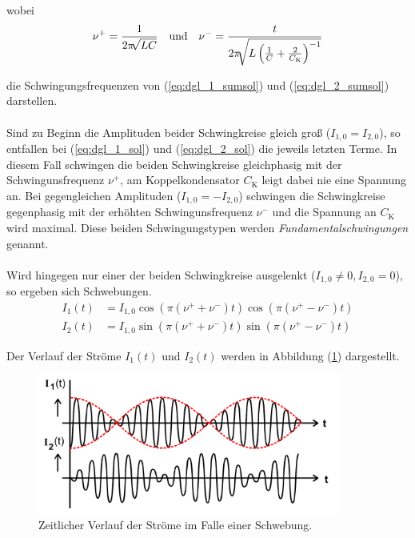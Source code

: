 wobei 
\begin{align} \label{eq:resonanzfrequenzen}
    \nu^+ &= \frac {1} {2 \pi \sqrt[]{LC}} & \mbox{\centering und} && \nu^- = \frac {t} {2 \pi \sqrt [] {L \left( \frac{1}{C} + \frac{2}{C_\text{K}} \right)^{-1} }}
\end{align}

die Schwingungsfrequenzen von (\ref{eq:dgl_1_sumsol}) und (\ref{eq:dgl_2_sumsol}) darstellen. \\
\\
Sind zu Beginn die Amplituden beider Schwingkreise gleich groß ($I_{1,0} = I_{2,0}$), so entfallen bei (\ref{eq:dgl_1_sol}) und (\ref{eq:dgl_2_sol})
die jeweils letzten Terme. In diesem Fall schwingen die beiden Schwingkreise gleichphasig mit der Schwingunsfrequenz $\nu^+$, am
Koppelkondensator $C_\text{K}$ leigt dabei nie eine Spannung an. Bei gegengleichen Amplituden ($I_{1,0} = -I_{2,0}$) schwingen die Schwingkreise gegenphasig
mit der erhöhten Schwingunsfrequenz $\nu^-$ und die Spannung an $C_\text{K}$ wird maximal. Diese beiden Schwingungstypen werden \textit{Fundamentalschwingungen} genannt. \\
\\
Wird hingegen nur einer der beiden Schwingkreise ausgelenkt ($I_{1,0} \neq 0, I_{2,0} = 0$), so ergeben sich Schwebungen.
\begin{align}
    I_{1}(t) &= I_{1,0} \cos(\pi (\nu^+ + \nu^-) t) \cos(\pi (\nu^+ - \nu^-) t) \label{eq:dgl_1_sol_schweb} \\
    I_{2}(t) &= I_{1,0} \sin(\pi (\nu^+ + \nu^-) t) \sin(\pi (\nu^+ - \nu^-) t) \label{eq:dgl_2_sol_schweb} 
\end{align}

Der Verlauf der Ströme $I_{1}(t)$ und $I_{2}(t)$ werden in Abbildung (\ref{fig:schwebung}) dargestellt.
\begin{figure} 
    \centering
    \includegraphics[width=10cm] {pictures/schwebung.png} 
    \caption{Zeitlicher Verlauf der Ströme im Falle einer Schwebung. \cite{v355}}
    \label{fig:schwebung}
\end{figure} 

